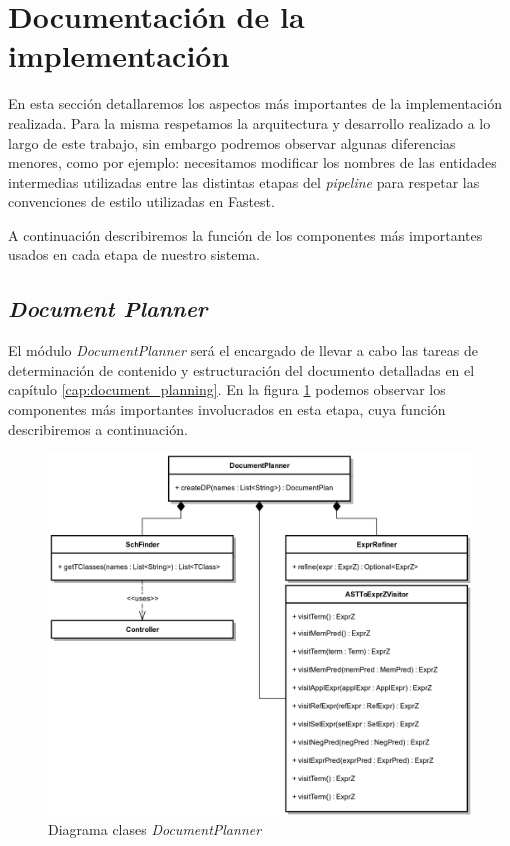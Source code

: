 \section{Documentación de la implementación}

En esta sección detallaremos los aspectos más importantes de la implementación realizada. Para la misma respetamos la arquitectura y desarrollo realizado a lo largo de este trabajo, sin embargo podremos observar algunas diferencias menores, como por ejemplo: necesitamos modificar los nombres de las entidades intermedias utilizadas entre las distintas etapas del \textit{pipeline} para respetar las convenciones de estilo utilizadas en Fastest.

A continuación describiremos la función de los componentes más importantes usados en cada etapa de nuestro sistema.

\subsection{\textit{Document Planner}}

El módulo \emph{DocumentPlanner} será el encargado de llevar a cabo las tareas de determinación de contenido y estructuración del documento detalladas en el capítulo \ref{cap:document_planning}. En la figura \ref{fig:imp_documentplanner} podemos observar los componentes más importantes involucrados en esta etapa, cuya función describiremos a continuación. 

\begin{figure}[H]
  	\centering
	\includegraphics[scale=0.25]{img/documentplanner_imp.png}
	\caption{Diagrama clases \textit{DocumentPlanner}}
  	\label{fig:imp_documentplanner}
\end{figure}

